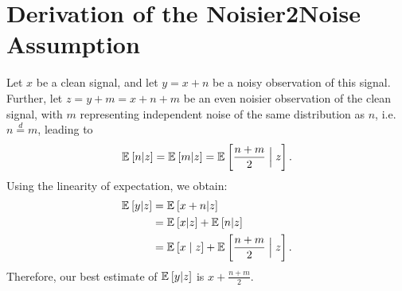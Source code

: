 \section{Derivation of the Noisier2Noise Assumption}

Let $x$ be a clean signal, and let $y = x + n$ be a noisy observation of this signal.
Further, let $z = y + m = x + n + m$ be an even noisier observation of the clean signal, with $m$ representing independent noise of the same distribution as $n$, i.e.\ $n\overset{d}{=}m$, leading to
\begin{equation}
    \mathbb{E}_{ } \left[n|z\right] = \mathbb{E}_{ } \left[m|z\right] = \mathbb{E}_{ } \left[\frac{n+m}{2} \mathrel{\Big|} z\right].
\end{equation}
Using the linearity of expectation, we obtain:
\begin{equation}
\begin{split}
    \mathbb{E}_{ } \left[y|z\right] &= \mathbb{E}_{ } \left[x+n|z\right]\\
    &= \mathbb{E}_{ } \left[x|z\right] + \mathbb{E}_{ } \left[n|z\right]\\
    &= \mathbb{E}_{ } \left[x\mid z\right] + \mathbb{E}_{ } \left[\frac{n+m}{2} \mathrel{\Big|} z\right].
\end{split}
\end{equation}
Therefore, our best estimate of $\mathbb{E}_{ } \left[y|z\right]$ is $x + \frac{n + m}{2}$.
